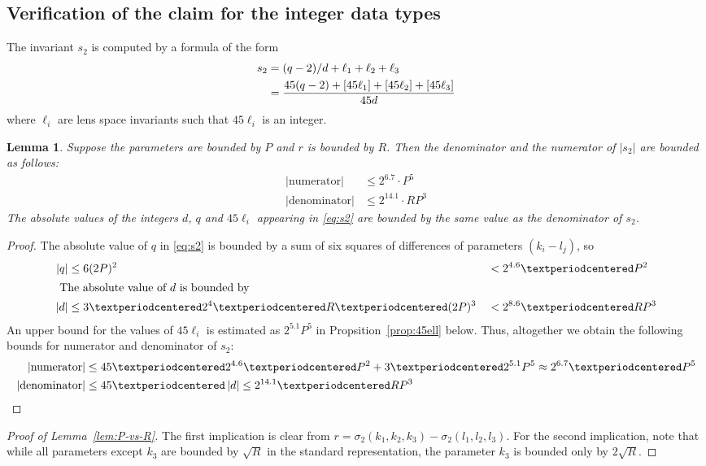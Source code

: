 \documentclass{article}
\newtheorem{lem}[thm]{Lemma}
\newcommand{\abs}[1]{\left|#1\right|}
\begin{document}
\subsection{Verification of the claim for the integer data types}
The invariant \(s_2\) is computed by a formula of the form
\begin{align}\label{eq:s2}
  \notag  s_2   &= (q-2)/d + \ell_1 + \ell_2 + \ell_3\\
                &= \frac{45(q-2) + [45\ell_1] + [45\ell_2] + [45\ell_3]}{45d}
\end{align}  
where \(\ell_i\) are lens space invariants such that \(45\ell_i\) is an integer.  

\begin{lem}\label{lem:s2}
  Suppose the parameters are bounded by \(P\) and \(r\) is bounded by \(R\).  Then the denominator and the numerator of \(\abs{s_2}\) are bounded as follows:
  \begin{align*}
    \abs{\text{numerator}}   &\leq 2^{6.7}·P^5\\
    \abs{\text{denominator}} &\leq 2^{14.1}· RP^3
  \end{align*}
  The absolute values of the integers \(d\), \(q\) and \(45\ell_i\) appearing in \eqref{eq:s2} are bounded by the same value as the denominator of \(s_2\).
\end{lem}
 
\begin{proof}
The absolute value of \(q\) in \eqref{eq:s2} is bounded by a sum of six squares of differences of parameters \((k_i-l_j)\), so 
\begin{alignat}{7}
  \abs{q}&\leq 6(2P)^2 &&< 2^{4.6}·P^2\\
  \intertext{
  The absolute value of \(d\) is bounded by}
  \notag 
  \abs{d} &\leq 3 · 2^4 · R · (2P)^3 &&< 2^{8.6} · RP^3
\end{alignat}
An upper bound for the values of  \(45\ell_i\) is estimated as \(2^{5.1}P^5\) in  Propsition~\ref{prop:45ell} below. 
Thus, altogether we obtain the following bounds for numerator and denominator of \(s_2\):
\begin{align*}
  \abs{\text{numerator}} &\leq 45·2^{4.6}·P^2 + 3·2^{5.1}P^5 \approx 2^{6.7}·P^5\\
  \abs{\text{denominator}} &\leq 45·\abs{d} \leq 2^{14.1}· R P^3\qedhere
\end{align*}
\end{proof}

\begin{proof}[Proof of Lemma~\ref{lem:P-vs-R}]
The first implication is clear from \(r = \sigma_2(k_1,k_2,k_3) - \sigma_2(l_1,l_2,l_3)\).
For the second implication, note that while all parameters except \(k_3\) are bounded by \(\sqrt{R}\) in the standard representation, the parameter \(k_3\) is bounded only by \(2\sqrt{R}\).
\end{proof}
\end{document}
